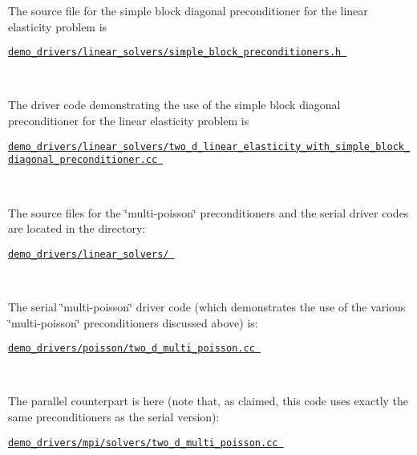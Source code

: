 \begin{DoxyItemize}
\item The source file for the simple block diagonal preconditioner for the linear elasticity problem is \begin{center} \href{../../../../demo_drivers/linear_solvers/simple_block_preconditioners.h}{\tt demo\+\_\+drivers/linear\+\_\+solvers/simple\+\_\+block\+\_\+preconditioners.\+h } \end{center}  ~\newline

\item The driver code demonstrating the use of the simple block diagonal preconditioner for the linear elasticity problem is \begin{center} \href{../../../../demo_drivers/linear_solvers/two_d_linear_elasticity_with_simple_block_diagonal_preconditioner.cc}{\tt demo\+\_\+drivers/linear\+\_\+solvers/two\+\_\+d\+\_\+linear\+\_\+elasticity\+\_\+with\+\_\+simple\+\_\+block\+\_\+diagonal\+\_\+preconditioner.\+cc } \end{center}  ~\newline

\item The source files for the \char`\"{}multi-\/poisson\char`\"{} preconditioners and the serial driver codes are located in the directory\+: \begin{center} \href{../../../../demo_drivers/linear_solvers/}{\tt demo\+\_\+drivers/linear\+\_\+solvers/ } \end{center}  ~\newline

\item The serial \char`\"{}multi-\/poisson\char`\"{} driver code (which demonstrates the use of the various \char`\"{}multi-\/poisson\char`\"{} preconditioners discussed above) is\+: \begin{center} \href{../../../../demo_drivers/linear_solvers/two_d_multi_poisson.cc}{\tt demo\+\_\+drivers/poisson/two\+\_\+d\+\_\+multi\+\_\+poisson.\+cc } \end{center}  ~\newline

\item The parallel counterpart is here (note that, as claimed, this code uses exactly the same preconditioners as the serial version)\+: \begin{center} \href{../../../../demo_drivers/mpi/solvers/two_d_multi_poisson.cc}{\tt demo\+\_\+drivers/mpi/solvers/two\+\_\+d\+\_\+multi\+\_\+poisson.\+cc } \end{center}  ~\newline


\end{DoxyItemize}
